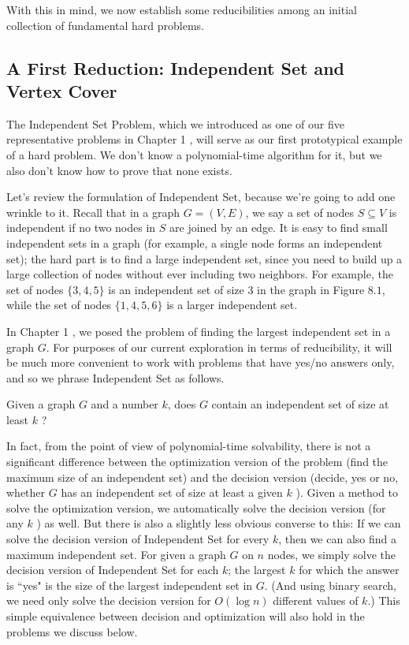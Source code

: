 \documentclass[a4paper, 12pt]{book}
\theoremstyle{dotless}
\begin{document}
With this in mind, we now establish some reducibilities among an initial collection of fundamental hard problems.

\subsection{A First Reduction: Independent Set and Vertex Cover}
The Independent Set Problem, which we introduced as one of our five representative problems in Chapter 1 , will serve as our first prototypical example of a hard problem. We don't know a polynomial-time algorithm for it, but we also don't know how to prove that none exists.

Let's review the formulation of Independent Set, because we're going to add one wrinkle to it. Recall that in a graph $G=(V, E)$, we say a set of nodes $S \subseteq V$ is independent if no two nodes in $S$ are joined by an edge. It is easy to find small independent sets in a graph (for example, a single node forms an independent set); the hard part is to find a large independent set, since you need to build up a large collection of nodes without ever including two neighbors. For example, the set of nodes $\{3,4,5\}$ is an independent set of size 3 in the graph in Figure $8.1$, while the set of nodes $\{1,4,5,6\}$ is a larger independent set.

In Chapter 1 , we posed the problem of finding the largest independent set in a graph $G$. For purposes of our current exploration in terms of reducibility, it will be much more convenient to work with problems that have yes/no answers only, and so we phrase Independent Set as follows.

Given a graph $G$ and a number $k$, does $G$ contain an independent set of size at least $k$ ?

In fact, from the point of view of polynomial-time solvability, there is not a significant difference between the optimization version of the problem (find the maximum size of an independent set) and the decision version (decide, yes or no, whether $G$ has an independent set of size at least a given $k$ ). Given a method to solve the optimization version, we automatically solve the decision version (for any $k$ ) as well. But there is also a slightly less obvious converse to this: If we can solve the decision version of Independent Set for every $k$, then we can also find a maximum independent set. For given a graph $G$ on $n$ nodes, we simply solve the decision version of Independent Set for each $k$; the largest $k$ for which the answer is ``yes" is the size of the largest independent set in $G$. (And using binary search, we need only solve the decision version for $O(\log n)$ different values of $k$.) This simple equivalence between decision and optimization will also hold in the problems we discuss below.
\end{document}

